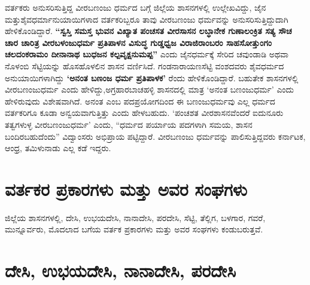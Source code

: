 ವರ್ತಕರು ಅನುಸರಿಸುತ್ತಿದ್ದ ವೀರಬಣಂಜು ಧರ್ಮದ ಬಗ್ಗೆ ಜಿಲ್ಲೆಯ ಶಾಸನಗಳಲ್ಲಿ ಉಲ್ಲೇಖವಿದ್ದು, ಜೈನ ಮತ್ತು\break ಶೈವಧರ್ಮಾನುಯಾಯಿಗಳಾದ ವರ್ತಕರಿಬ್ಬರೂ ತಾವು ವೀರಬಣಂಜು ಧರ್ಮವನ್ನು ಅನುಸರಿಸುತ್ತಿದ್ದುದಾಗಿ ಹೇಳಿಕೊಂಡಿದ್ದಾರೆ. \textbf{“ಸ್ವಸ್ತಿ ಸಮಸ್ತ ಭುವನ ವಿಖ್ಯಾತ ಪಂಚಸತ ವೀರಸಾಸನ ಲಬ್ಧಾನೇಕ ಗುಣಾಲಂಕ್ರಿತ ಸತ್ಯ ಸೌಚ ಚಾರ ಚಾರಿತ್ರ ವೀರಬಳಂಜುಧರ್ಮ ಪ್ರತಿಪಾಳನ ವಿಸುದ್ಧ ಗುಡ್ಡಧ್ವಜ ವಿರಾಜಿರಾಂಬರಂ ಸಾಹಸೋತ್ತುಂಗಂ ಚಲದಂಕರಾಮಂ ದೀನಾನಾಥ ಬುಧಜನ\general{\break } ಕಲ್ಪವೃಕ್ಷನುಮಪ್ಪ”} ಎಂದು ಜೈನಧರ್ಮಕ್ಕೆ ಸೇರಿದ ಚವುಂಡಾಡಿ ಅಥವಾ ನೊಳಂಬಿ ಸೆಟ್ಟಿಯನ್ನು ಹೊಸಹೊಳಲಿನ ಶಾಸನ ವರ್ಣಿಸಿದೆ. ಗಂಡನಾರಾಯಣಸೆಟ್ಟಿ ವಂಶದವರು ಶೈವಧರ್ಮದ ಅನುಯಾಯಿಗಳಾಗಿದ್ದು \textbf{‘ಅನಂತ ಬಣಂಜ ಧರ್ಮ ಪ್ರತಿಪಾಳಕ’} ರೆಂದು ಹೇಳಿಕೊಂಡಿದ್ದಾರೆ. ಬಹುತೇಕ ಶಾಸನಗಳಲ್ಲಿ ವೀರಬಣಂಜುಧರ್ಮ ಎಂದು ಹೇಳಿದ್ದು,\break ಅಗ್ರಹಾರಬಾಚಹಳ್ಳಿ ಶಾಸನದಲ್ಲಿ ಮಾತ್ರ ‘ಅನಂತ ಬಣಂಜುಧರ್ಮ’ ಎಂದು ಹೇಳಿರುವುದು ವಿಶೇಷವಾಗಿದೆ. ಅನಂತ ಎಂಬ ಪದಪ್ರಯೋಗದಿಂದ ಈ ಬಣಂಜುಧರ್ಮವು ಎಲ್ಲ ಧರ್ಮದ ವರ್ತಕರಿಗೂ ಕೂಡಾ ಅನ್ವಯವಾಗುತ್ತಿತ್ತು ಎಂದು ಹೇಳಬಹುದು. ‘ಪಂಚಶತ ವೀರಶಾಸನವೆಂದರೆ ಐದುನೂರು ತತ್ವಗಳುಳ್ಳ ವೀರಬಣಂಜುಧರ್ಮ’ ಎಂದು, “ಧರ್ಮದ ಪರ್ಯಾಯ ಪದಗಳಾಗಿ ಸಮಯ, ಶಾಸನ ಬಂದಿರಬಹುದೆಂದು” ವಿದ್ವಾಂಸರು ಅಭಿಪ್ರಾಯ ಪಟ್ಟಿದ್ದಾರೆ. ವೀರಬಣಂಜು ಧರ್ಮವನ್ನು ಪಾಲಿಸುತ್ತಿದ್ದವರು ಕರ್ನಾಟಕ, ಆಂಧ್ರ, ತಮಿಳುನಾಡು ಎಲ್ಲ ಕಡೆ ಇದ್ದರು.

\section{ವರ್ತಕರ ಪ್ರಕಾರಗಳು ಮತ್ತು ಅವರ ಸಂಘಗಳು}

ಜಿಲ್ಲೆಯ ಶಾಸನಗಳಲ್ಲಿ, ದೇಸಿ, ಉಭಯದೇಸಿ, ನಾನಾದೇಸಿ, ಪರದೇಸಿ, ಸೆಟ್ಟಿ, ತೆಲ್ಲಿಗ, ಬಳಗಾರ, ಗವರೆ, ಮುನ್ನೂರ್ವರು, ಮೊದಲಾದ ಬಗೆಯ ವರ್ತಕ ಪ್ರಕಾರಗಳು ಮತ್ತು ಅವರ ಸಂಘಗಳು ಕಂಡುಬರುತ್ತವೆ.

\section{ದೇಸಿ, ಉಭಯದೇಸಿ, ನಾನಾದೇಸಿ, ಪರದೇಸಿ}

